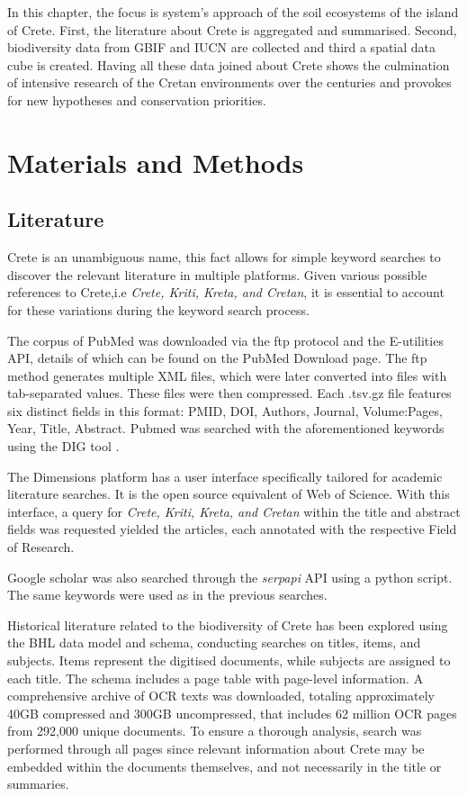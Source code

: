 In this chapter, the focus is system's approach of the soil ecosystems of the island of Crete.
First, the literature about Crete is aggregated and summarised. Second, biodiversity data
from GBIF and IUCN \parencite{iucn2024} are collected and third a spatial data cube is created. 
Having all these data joined about Crete shows the culmination of intensive 
research of the Cretan environments over the centuries and provokes for new
hypotheses and conservation priorities.


\section{Materials and Methods}\label{integration_methods}

\subsection{Literature}\label{crete-literature}

Crete is an unambiguous name, this fact allows for simple keyword searches to discover 
the relevant literature in multiple platforms. Given various possible references to Crete,i.e \textit{Crete, Kriti, Kreta, and Cretan},
it is essential to account for these variations during the keyword search process.

The corpus of PubMed was downloaded via the ftp protocol and the E-utilities API, details of which can be found on the PubMed Download page.
The ftp method generates multiple XML files, which were later converted into
files with tab-separated values. These files were then compressed. Each .tsv.gz file
features six distinct fields in this format: PMID, DOI, Authors, Journal, Volume:Pages, Year, Title, Abstract.
Pubmed was searched with the aforementioned keywords using the DIG tool \parencite{fanini2021coupling}.

The Dimensions platform has a user interface specifically tailored for academic literature searches.
It is the open source equivalent of Web of Science.
With this interface, a query for \textit{Crete, Kriti, Kreta, and Cretan} within
the title and abstract fields was requested yielded the articles, each annotated with the respective Field of Research.

Google scholar was also searched through the \textit{serpapi} API using
a python script. The same keywords were used as in the previous searches.

Historical literature related to the biodiversity of Crete has been explored
using the BHL data model and schema, conducting searches on titles, items, and subjects.
Items represent the digitised documents, while subjects are assigned to each title.
The schema includes a page table with page-level information.
A comprehensive archive of OCR texts was downloaded, totaling approximately
40GB compressed and 300GB uncompressed, that includes 62 million OCR pages from 292,000 unique documents.
To ensure a thorough analysis, search was performed through all pages since
relevant information about Crete may be embedded within the documents
themselves, and not necessarily in the title or summaries.

